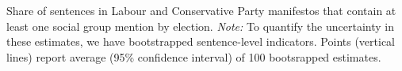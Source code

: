 Share of sentences in Labour and Conservative Party manifestos that contain at least one social group mention by election. \emph{Note:} To quantify the uncertainty in these estimates, we have bootstrapped sentence-level indicators. Points (vertical lines) report average (95\% confidence interval) of 100 bootsrapped estimates. \label{fig:lab_con_sg_salience_overtime}
